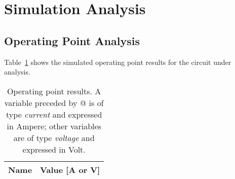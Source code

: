 \section{Simulation Analysis}
\label{sec:simulation}

\subsection{Operating Point Analysis}

Table~\ref{tab:op} shows the simulated operating point results for the circuit under analysis.

\begin{table}[htb!]
  \centering
  \begin{tabular}{|l|r|}
    \hline    
    {\bf Name} & {\bf Value [A or V]} \\ \hline
    
  \end{tabular}
  \caption{Operating point results. A variable preceded by @ is of type {\em current}
    and expressed in Ampere; other variables are of type {\it voltage} and expressed in
    Volt.}
  \label{tab:op}
\end{table}
